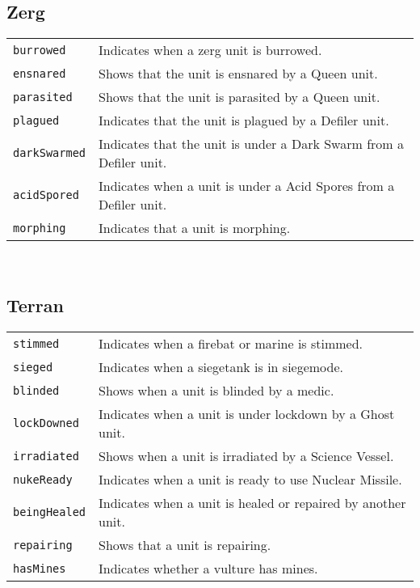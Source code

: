 \subsection{Zerg}
\begin{tabularx}{\textwidth}{lX}
\verb|burrowed| & Indicates when a zerg unit is burrowed. \\
\verb|ensnared| & Shows that the unit is ensnared by a Queen unit. \\
\verb|parasited| & Shows that the unit is parasited by a Queen unit. \\
\verb|plagued| & Indicates that the unit is plagued by a Defiler unit. \\
\verb|darkSwarmed| & Indicates that the unit is under a Dark Swarm from a Defiler unit. \\
 \verb|acidSpored | & Indicates when a unit is under a Acid Spores from a Defiler unit. \\
\verb|morphing| & Indicates that a unit is morphing. \\
\end{tabularx} \\

\subsection{Terran}
\begin{tabularx}{\textwidth}{lX}
 \verb|stimmed| & Indicates when a firebat or marine is stimmed.\\
 \verb|sieged| & Indicates when a siegetank is in siegemode.\\
 \verb|blinded| & Shows when a unit is blinded by a medic. \\
 \verb|lockDowned| & Indicates when a unit is under lockdown by a Ghost unit. \\
 \verb|irradiated| & Shows when a unit is irradiated by a Science Vessel. \\
 \verb|nukeReady| & Indicates when a unit is ready to use Nuclear Missile. \\
 \verb|beingHealed| & Indicates when a unit is healed or repaired by another unit. \\
 \verb|repairing| & Shows that a unit is repairing. \\
 \verb|hasMines | & Indicates whether a vulture has mines.\\
\end{tabularx} \\

